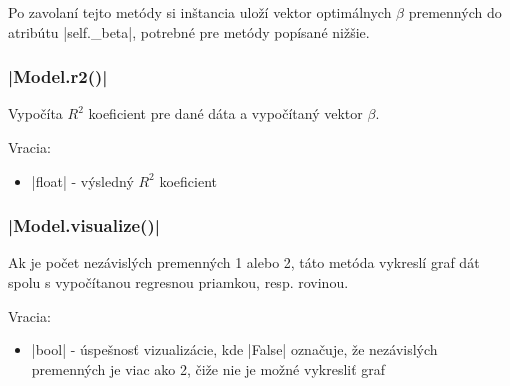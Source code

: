\documentclass[report.tex]{subfiles}
\begin{document}
Po zavolaní tejto metódy si inštancia uloží vektor optimálnych $\beta$ premenných do atribútu \pyth|self._beta|, potrebné pre metódy popísané nižšie.

\subsubsection*{\pyth|Model.r2()|}

Vypočíta $R^2$ koeficient pre dané dáta a vypočítaný vektor $\beta$.

Vracia:

\begin{itemize}
	\item \pyth|float| - výsledný $R^2$ koeficient
\end{itemize}

\subsubsection*{\pyth|Model.visualize()|}

Ak je počet nezávislých premenných 1 alebo 2, táto metóda vykreslí graf dát spolu s vypočítanou regresnou priamkou, resp. rovinou. 

Vracia:

\begin{itemize}
	\item \pyth|bool| - úspešnosť vizualizácie, kde \pyth|False| označuje, že nezávislých premenných je viac ako 2, čiže nie je možné vykresliť graf
\end{itemize}

%
%
%
%
%
\end{document}
